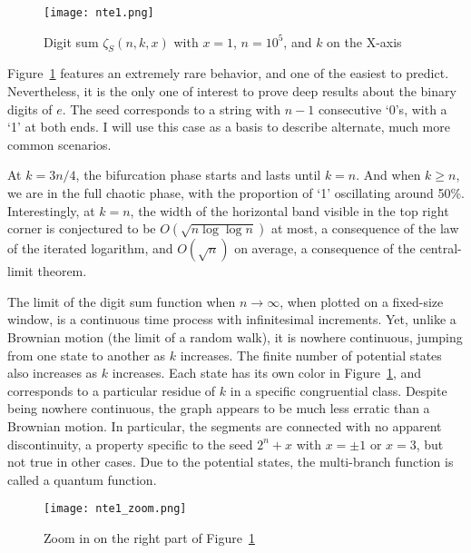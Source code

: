 \documentclass[10pt]{article}
\begin{document}
\begin{figure}[H]
\centering
\texttt{[image: nte1.png]}
\caption{Digit sum $\zeta_S(n,k,x)$ with $x=1$, $n=10^5$, and $k$ on the X-axis}
\label{fig:ggk3vb5dlk}
\end{figure}

Figure~\ref{fig:ggk3vb5dlk} features an extremely rare behavior, and one of the easiest to predict. Nevertheless, it is  the only one of interest to prove deep results about the binary digits of $e$. The seed corresponds to a string with $n-1$ consecutive `0's, with a `1' at both ends. I will use this case as a basis to describe alternate, much more common scenarios.   

At $k = 3n/4$, the \textcolor{index}{bifurcation phase} starts and lasts until
 $k=n$. And when $k\geq n$, we are in the full \textcolor{index}{chaotic phase}, with the 
 proportion of `1' oscillating around 50\%. Interestingly, at $k=n$, the width of the horizontal band visible in the top right corner
 is conjectured to be $O(\sqrt{n\log\log n})$ at most, a consequence of the \textcolor{index}{law of the iterated logarithm}, and $O(\sqrt{n})$ on average, a consequence of the 
\textcolor{index}{central-limit theorem}.
 
 The limit of the digit sum function when $n\rightarrow\infty$, when plotted on a fixed-size window, 
is a continuous time process with infinitesimal increments. Yet, unlike a Brownian motion (the limit of
 a random walk), it is nowhere continuous, jumping from one state to another as $k$ increases. 
The finite number of potential states also increases as $k$ increases. Each state has its own color in Figure~\ref{fig:ggk3vb5dlk}, 
 and corresponds to a particular residue of $k$ in a specific \textcolor{index}{congruential class}. 
Despite being nowhere continuous, the graph appears to be much less erratic than a Brownian motion. In particular,
 the segments are connected with no apparent discontinuity, a property specific to the seed $2^n + x$ with $x=\pm 1$ or $x=3$, but not true in other cases. Due to the potential states, the multi-branch function is called a 
\textcolor{index}{quantum function}.
\vspace{1ex}

\begin{figure}[H]
\centering
\texttt{[image: nte1\_zoom.png]}
\caption{Zoom in on the right part of Figure~\ref{fig:ggk3vb5dlk}}
\label{fig:g609jb5dlk_green}
\end{figure}
\end{document}
